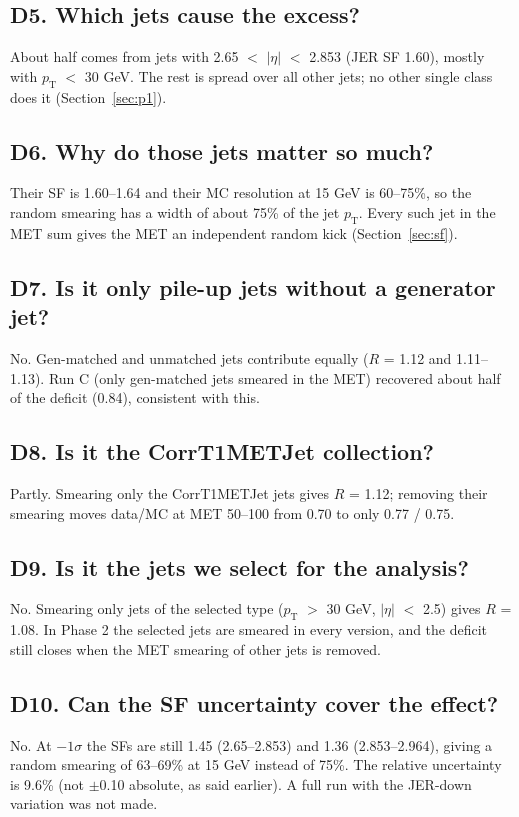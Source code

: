 \documentclass[11pt,a4paper]{article}
\newcommand{\pt}{$p_\mathrm{T}$}
\newcommand{\aeta}{$|\eta|$}
\begin{document}
\subsection*{D5. Which jets cause the excess?}
About half comes from jets with 2.65 $<$ \aeta{} $<$ 2.853 (JER SF 1.60), mostly with \pt{} $<$ 30 GeV. The rest is spread over all
other jets; no other single class does it (Section~\ref{sec:p1}).

\subsection*{D6. Why do those jets matter so much?}
Their SF is 1.60--1.64 and their MC resolution at 15 GeV is 60--75\%, so the random smearing has a width of about 75\% of the jet \pt.
Every such jet in the MET sum gives the MET an independent random kick (Section~\ref{sec:sf}).

\subsection*{D7. Is it only pile-up jets without a generator jet?}
No. Gen-matched and unmatched jets contribute equally ($R$ = 1.12 and 1.11--1.13). Run C (only gen-matched jets smeared in the MET)
recovered about half of the deficit (0.84), consistent with this.

\subsection*{D8. Is it the CorrT1METJet collection?}
Partly. Smearing only the CorrT1METJet jets gives $R$ = 1.12; removing their smearing moves data/MC at MET 50--100 from 0.70 to only 0.77 / 0.75.

\subsection*{D9. Is it the jets we select for the analysis?}
No. Smearing only jets of the selected type (\pt{} $>$ 30 GeV, \aeta{} $<$ 2.5) gives $R$ = 1.08. In Phase 2 the selected jets are smeared in
every version, and the deficit still closes when the MET smearing of other jets is removed.

\subsection*{D10. Can the SF uncertainty cover the effect?}
No. At $-1\sigma$ the SFs are still 1.45 (2.65--2.853) and 1.36 (2.853--2.964), giving a random smearing of 63--69\% at 15 GeV instead
of 75\%. The relative uncertainty is 9.6\% (not $\pm$0.10 absolute, as said earlier). A full run with the JER-down variation was not made.
\end{document}
